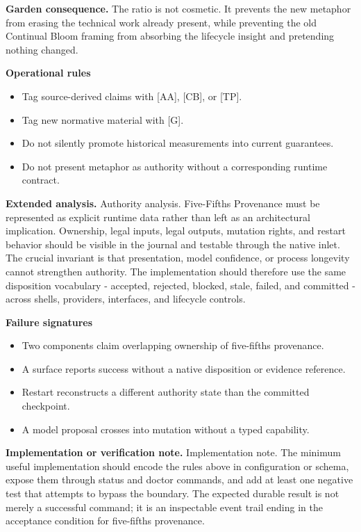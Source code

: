 \documentclass[10pt,letterpaper,oneside]{article}
\begin{document}
\textbf{Garden consequence.} The ratio is not cosmetic. It prevents the new metaphor from erasing the technical work already present, while preventing the old Continual Bloom framing from absorbing the lifecycle insight and pretending nothing changed.

\textbf{Operational rules}
\begin{itemize}
\item Tag source-derived claims with [AA], [CB], or [TP].
\item Tag new normative material with [G].
\item Do not silently promote historical measurements into current guarantees.
\item Do not present metaphor as authority without a corresponding runtime contract.
\end{itemize}
\textbf{Extended analysis.} Authority analysis. Five-Fifths Provenance must be represented as explicit runtime data rather than left as an architectural implication. Ownership, legal inputs, legal outputs, mutation rights, and restart behavior should be visible in the journal and testable through the native inlet. The crucial invariant is that presentation, model confidence, or process longevity cannot strengthen authority. The implementation should therefore use the same disposition vocabulary - accepted, rejected, blocked, stale, failed, and committed - across shells, providers, interfaces, and lifecycle controls.

\textbf{Failure signatures}
\begin{itemize}
\item Two components claim overlapping ownership of five-fifths provenance.
\item A surface reports success without a native disposition or evidence reference.
\item Restart reconstructs a different authority state than the committed checkpoint.
\item A model proposal crosses into mutation without a typed capability.
\end{itemize}
\textbf{Implementation or verification note.} Implementation note. The minimum useful implementation should encode the rules above in configuration or schema, expose them through status and doctor commands, and add at least one negative test that attempts to bypass the boundary. The expected durable result is not merely a successful command; it is an inspectable event trail ending in the acceptance condition for five-fifths provenance.
\end{document}
